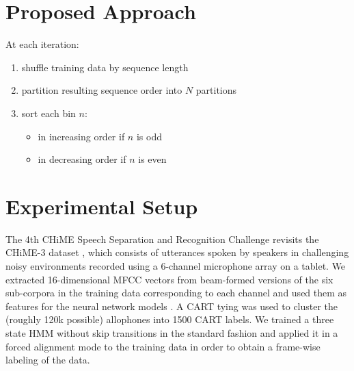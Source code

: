 \documentclass{article}
\begin{document}
  \section{Proposed Approach} \label{sec:approach}
  At each iteration:
  \begin{enumerate}
  	\item shuffle training data by sequence length
  	\item partition resulting sequence order into $N$ partitions
  	\item sort each bin $n$:
  	\begin{itemize}
  		\item in increasing order if $n$ is odd
  		\item in decreasing order if $n$ is even
  	\end{itemize}
  \end{enumerate}

  \section{Experimental Setup} \label{sec:setup}
  The 4th CHiME Speech Separation and Recognition Challenge
  \cite{Vincent_CSL2016:CHiME4} revisits the CHiME-3 dataset \cite{Barker2015:CHiME3},
  which consists of utterances spoken by speakers in challenging noisy environments recorded using a 6-channel microphone array on a tablet.
  We extracted 16-dimensional MFCC vectors from beam-formed versions of the six sub-corpora in the training data corresponding to each channel
  and used them as features for the neural network models \cite{menne16:chime4System}.
  A CART tying was used to cluster the (roughly 120k possible) allophones into 1500 CART labels.
  We trained a three state HMM without skip transitions in the standard fashion and applied it in a forced alignment mode to the training data
  in order to obtain a frame-wise labeling of the data.
\end{document}
